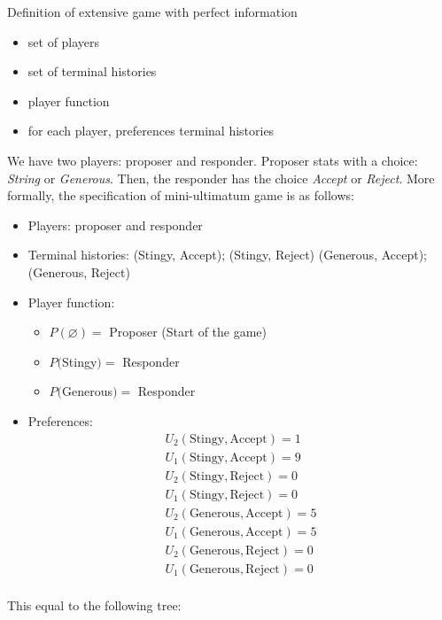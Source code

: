 \begin{definition}
      Definition of extensive game with perfect information
      \begin{itemize}
            \item set of players
            \item set of terminal histories
            \item player function
            \item for each player, preferences terminal histories
      \end{itemize}
\end{definition}

\begin{example}
      We have two players: proposer and responder. Proposer stats with a choice: \textit{String} or \textit{Generous}. Then, the responder has the choice \textit{Accept} or \textit{Reject}. More formally, the specification of mini-ultimatum game is as follows:
      \begin{itemize}
            \item Players: proposer and responder
            \item Terminal histories:
                  (Stingy, Accept); (Stingy, Reject)
                  (Generous, Accept); (Generous, Reject)
            \item Player function:
                  \begin{itemize}
                        \item $P(\varnothing)=$ Proposer (Start of the game)
                        \item $P($Stingy$)=$ Responder
                        \item $P($Generous$)=$ Responder
                  \end{itemize}
            \item Preferences:
                  \begin{align*}
                        U_2(\text{Stingy},\text{Accept})=1    \\
                        U_1 (\text{Stingy},\text{Accept})=9   \\
                        U_2(\text{Stingy},\text{Reject})=0    \\
                        U_1 (\text{Stingy},\text{Reject})=0   \\
                        U_2(\text{Generous},\text{Accept})=5  \\
                        U_1 (\text{Generous},\text{Accept})=5 \\
                        U_2(\text{Generous},\text{Reject})=0  \\
                        U_1 (\text{Generous},\text{Reject})=0 \\
                  \end{align*}
      \end{itemize}
      This equal to the following tree:


\end{example}
